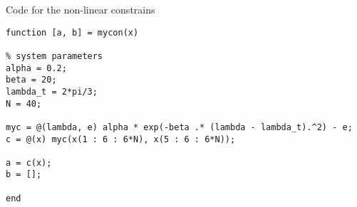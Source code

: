 Code for the non-linear constrains
\begin{lstlisting}
function [a, b] = mycon(x)

% system parameters
alpha = 0.2;
beta = 20;
lambda_t = 2*pi/3;
N = 40;

myc = @(lambda, e) alpha * exp(-beta .* (lambda - lambda_t).^2) - e;
c = @(x) myc(x(1 : 6 : 6*N), x(5 : 6 : 6*N));

a = c(x);
b = [];

end
\end{lstlisting}